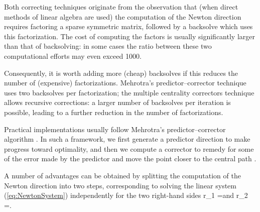 Both correcting techniques originate from the observation that 
(when direct methods of linear algebra are used) the computation 
of the Newton direction requires factoring a sparse symmetric matrix, 
followed by a backsolve which uses this factorization. 
The cost of computing the factors is usually significantly larger than that 
of backsolving: in some cases the ratio between these two computational 
efforts may even exceed 1000. 


Consequently, it is worth adding more (cheap) 
backsolves if this reduces the number of (expensive) factorizations. 
Mehrotra's predictor--corrector technique \cite{Mehrotra92} uses two 
backsolves per factorization; the multiple centrality correctors technique
\cite{Gondzio96} allows recursive corrections: a larger number 
of backsolves per iteration is possible, leading to a further reduction 
in the number of factorizations. 


Practical implementations usually follow Mehrotra's predictor--corrector 
algorithm \cite{Mehrotra92}. In such a framework, we first generate a 
predictor direction to make progress toward optimality, and then we 
compute a corrector to remedy for some of the error made by the predictor
and move the point closer to the central path .


A number of advantages can be obtained by splitting the computation 
of the Newton direction into two steps, corresponding to solving the linear
system (\ref{eq:NewtonSystem}) independently for the two right-hand 
sides 
\be \label{PredictorRhs}
r_1 = \quad \mbox{and} \quad
r_2 =\left[ 
  \begin{array}{c}
    0 \\ 0 \\ \mu e
  \end{array} \right].
\ee

